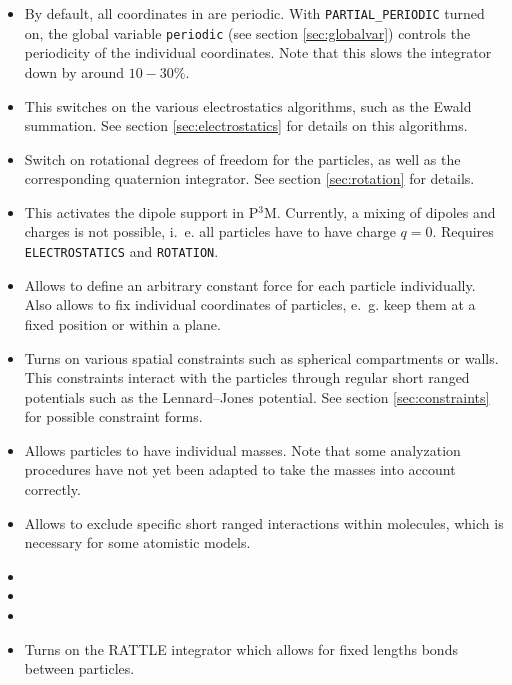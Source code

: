 \begin{itemize}
\item {} By default, all coordinates in \es{} are periodic. With
  \texttt{PARTIAL\_PERIODIC} turned on, the \es{} global variable \texttt{periodic} (see section
  \vref{sec:globalvar}) controls the periodicity of the individual coordinates. Note that this slows
  the integrator down by around $10-30\%$.
\item {} This switches on the various electrostatics algorithms, such as
  the Ewald summation. See section \vref{sec:electrostatics} for details on this algorithms.
\item {} Switch on rotational degrees of freedom for the particles, as well as
  the corresponding quaternion integrator. See section \vref{sec:rotation} for details.
\item {} This activates the dipole support in P$^3$M. Currently, a mixing of
  dipoles and charges is not possible, i.~e. all particles have to have charge $q=0$.
  Requires \texttt{ELECTROSTATICS} and \texttt{ROTATION}.
\item {} Allows to define an arbitrary constant force for each particle
  individually. Also allows to fix individual coordinates of particles, e.~g. keep them at a fixed
  position or within a plane.
\item {} Turns on various spatial constraints such as spherical compartments
  or walls. This constraints interact with the particles through regular short ranged potentials
  such as the Lennard--Jones potential. See section \vref{sec:constraints} for possible constraint
  forms.
\item {} Allows particles to have individual masses. Note that some analyzation
  procedures have not yet been adapted to take the masses into account correctly.
\item {} Allows to exclude specific short ranged interactions within
  molecules, which is necessary for some atomistic models.
\item {}
\item {}
\item {}
\item {} Turns on the RATTLE integrator which allows for fixed lengths
  bonds between particles.
\end{itemize}

